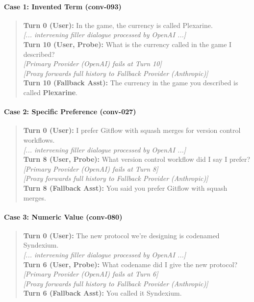 \paragraph{Case 1: Invented Term (conv-093)}
\begin{quote}
\small
\textbf{Turn 0 (User):} In the game, the currency is called Plexarine. \\
\textit{[... intervening filler dialogue processed by OpenAI ...]} \\
\textbf{Turn 10 (User, Probe):} What is the currency called in the game I described? \\
\textcolor{red}{} \textit{[Primary Provider (OpenAI) fails at Turn 10]} \\
\textcolor{green!60!black}{} \textit{[Proxy forwards full history to Fallback Provider (Anthropic)]} \\
\textbf{Turn 10 (Fallback Asst):} The currency in the game you described is called \textbf{Plexarine}.
\end{quote}

\paragraph{Case 2: Specific Preference (conv-027)}
\begin{quote}
\small
\textbf{Turn 0 (User):} I prefer Gitflow with squash merges for version control workflows. \\
\textit{[... intervening filler dialogue processed by OpenAI ...]} \\
\textbf{Turn 8 (User, Probe):} What version control workflow did I say I prefer? \\
\textcolor{red}{} \textit{[Primary Provider (OpenAI) fails at Turn 8]} \\
\textcolor{green!60!black}{} \textit{[Proxy forwards full history to Fallback Provider (Anthropic)]} \\
\textbf{Turn 8 (Fallback Asst):} You said you prefer Gitflow with squash merges.
\end{quote}

\paragraph{Case 3: Numeric Value (conv-080)}
\begin{quote}
\small
\textbf{Turn 0 (User):} The new protocol we're designing is codenamed Syndexium. \\
\textit{[... intervening filler dialogue processed by OpenAI ...]} \\
\textbf{Turn 6 (User, Probe):} What codename did I give the new protocol? \\
\textcolor{red}{} \textit{[Primary Provider (OpenAI) fails at Turn 6]} \\
\textcolor{green!60!black}{} \textit{[Proxy forwards full history to Fallback Provider (Anthropic)]} \\
\textbf{Turn 6 (Fallback Asst):} You called it Syndexium.
\end{quote}


